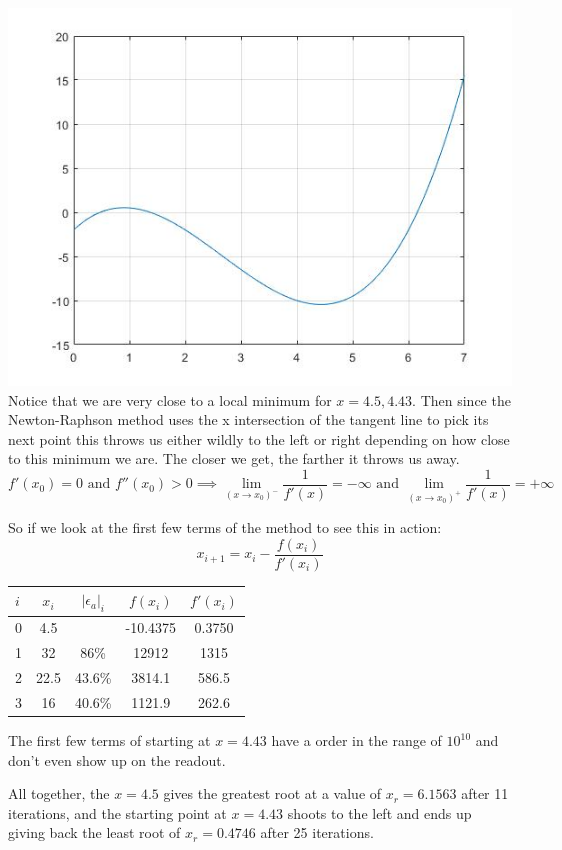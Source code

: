 \documentclass{article}
\begin{document}
\includegraphics[width=\linewidth]{HW5-PolynomialGraph2.jpg}
Notice that we are very close to a local minimum for $x=4.5,4.43$. Then since the Newton-Raphson method uses the x intersection of the tangent line to pick its next point this throws us either wildly to the left or right depending on how close to this minimum we are. The closer we get, the farther it throws us away.
\[ f'(x_0)=0 \text{ and } f''(x_{0})>0 \implies \lim_{(x\to x_{0})^{-}}\frac{1}{f'(x)}=-\infty \text{ and } \lim_{(x\to x_{0})^{+}}\frac{1}{f'(x)}=+\infty \]

So if we look at the first few terms of the method to see this in action:
\[ x_{i+1} = x_{i} - \frac{f(x_{i})}{f'(x_{i})} \]
\begin{center}
	\begin{tabular}{| l c c | c c |}
\hline
$i$	&	$x_{i}$	&	$| \epsilon_a |_{i}$	&	$f(x_{i})$	&	$f'(x_{i})$\\
\hline
0	&	4.5		&							&	-10.4375	&	0.3750\\ 
1	&	32		&	86\%					&	12912		&	1315\\ 
2	&	22.5	&	43.6\%					&	3814.1		&	586.5\\ 
3	&	16		&	40.6\%					&	1121.9		&	262.6\\
\hline
	\end{tabular}
\end{center}

The first few terms of starting at $x=4.43$ have a order in the range of $10^{10}$ and don't even show up on the readout. 

All together, the $x=4.5$ gives the greatest root at a value of $x_{r}=6.1563$ after 11 iterations, and the starting point at $x=4.43$ shoots to the left and ends up giving back the least root of $x_{r}=0.4746$ after 25 iterations.
\end{document}
